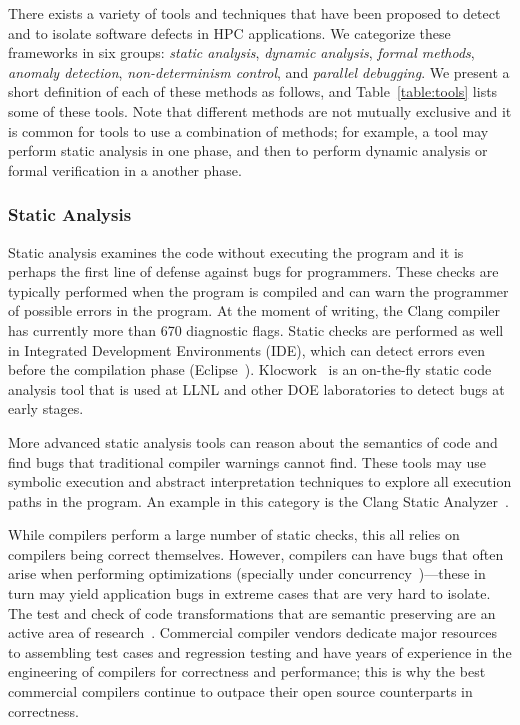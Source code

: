 There exists a variety of tools and techniques that have been proposed to
detect and to isolate software defects in HPC applications. We categorize
these frameworks in six groups:
\textit{static analysis},
\textit{dynamic analysis},
\textit{formal methods},
\textit{anomaly detection},
\textit{non-determinism control}, and
\textit{parallel debugging}.
We present a short definition of each of these methods as follows, and Table~\ref{table:tools}
lists some of these tools. Note that different methods are not mutually exclusive 
and it is common for tools to use a combination of methods; for example, a tool may 
perform static analysis in one phase, and then to perform dynamic analysis
or formal verification in a another phase.



\subsubsection{Static Analysis}
Static analysis examines the code without executing the program and it is 
perhaps the first line of defense against bugs for programmers. These checks
are typically performed when the program is compiled and can warn the programmer
of possible errors in the program. At the moment of writing, the Clang compiler
has currently more than 670 diagnostic flags. Static checks are performed as well
in Integrated Development Environments (IDE), which can detect errors even before the
compilation phase (Eclipse~\cite{Eclipse}). Klocwork~\cite{KLOCWORK} is an on-the-fly static code analysis
tool that is used at LLNL and other DOE laboratories to detect bugs at early stages. 

More advanced static analysis tools can reason about the semantics of code and find bugs
that traditional compiler warnings cannot find. These tools may use symbolic execution
and abstract interpretation techniques to explore all execution paths in the program.
An example in this category is the Clang Static Analyzer~\cite{ClangStatic}.

While compilers perform a large number of static checks,
this all relies on compilers being correct themselves. However, compilers
can have bugs that often arise when performing optimizations (specially under
concurrency~\cite{chakraborty2016})---these in turn may yield application bugs in 
extreme cases that are very hard to isolate. The test and check of code 
transformations that are semantic preserving
are an active area of research~\cite{leroy2009formal}. Commercial compiler 
vendors dedicate major resources to assembling test cases and 
regression testing and have years of experience in the engineering of 
compilers for correctness and performance; this is why the best 
commercial compilers continue to outpace their open source counterparts
in correctness.

